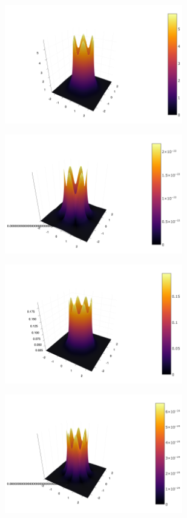 \documentclass[a4paper,10pt]{article}
\begin{document}
\begin{figure}[htb!]
\begin{subfigure}[b]{0.5\textwidth}
\caption{}
\end{subfigure}
\begin{subfigure}[b]{0.5\textwidth}
\includegraphics[width=220pt]{E3julia.png}
\caption{}
\end{subfigure}
\begin{subfigure}[b]{0.5\textwidth}
\includegraphics[width=220pt]{H3julia.png}
\caption{}
\end{subfigure}
\begin{subfigure}[b]{0.5\textwidth}
\includegraphics[width=220pt]{E4julia.png}
\caption{}
\end{subfigure}
\begin{subfigure}[b]{0.5\textwidth}
\includegraphics[width=220pt]{H4julia.png}

\end{subfigure}
\end{figure}
\end{document}
